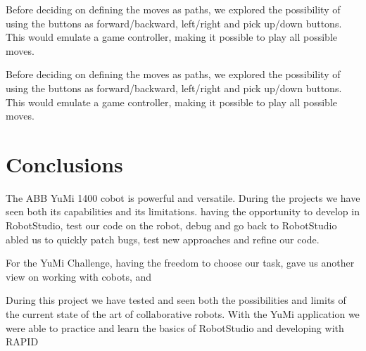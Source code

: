 \documentclass[a4paper,12pt]{article}
\begin{document}
Before deciding on defining the moves as paths, we explored the possibility of using the buttons as forward/backward, left/right and pick up/down buttons. This would emulate a game controller, making it possible to play all possible moves.  


Before deciding on defining the moves as paths, we explored the possibility of using the buttons as forward/backward, left/right and pick up/down buttons. This would emulate a game controller, making it possible to play all possible moves.  

\section{Conclusions} 
The ABB YuMi 1400 cobot is powerful and versatile. During the projects we have seen both its capabilities and its limitations. 
having the opportunity  to develop in RobotStudio, test our code on the robot, debug and go back to RobotStudio abled us to quickly patch bugs, test new approaches and refine our code. 

For the YuMi Challenge, having the freedom to choose our task, gave us another view on working with cobots, and 

During this project we have tested and seen both the possibilities and limits of the current state of the art of collaborative robots. With the YuMi application we were able to practice and learn the basics of RobotStudio and developing with RAPID
\end{document}
